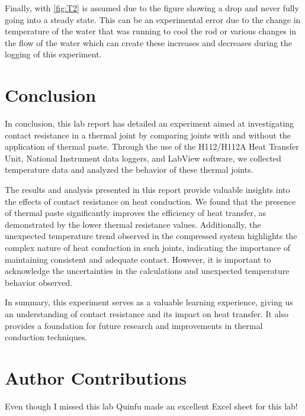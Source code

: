 \documentclass[10pt,twocolumn]{article}
\begin{document}
 Finally, with  \autoref{fig:T2} is assumed due to the figure showing a drop and never fully going into a steady state. This can be an experimental error due to the change in temperature of the water that was running to cool the rod or various changes in the flow of the water which can create these increases and decreases during the logging of this experiment. 

 

\section{Conclusion}

In conclusion, this lab report has detailed an experiment aimed at investigating contact resistance in a thermal joint by comparing joints with and without the application of thermal paste. Through the use of the H112/H112A Heat Transfer Unit, National Instrument data loggers, and LabView software, we collected temperature data and analyzed the behavior of these thermal joints.

The results and analysis presented in this report provide valuable insights into the effects of contact resistance on heat conduction. We found that the presence of thermal paste significantly improves the efficiency of heat transfer, as demonstrated by the lower thermal resistance values. Additionally, the unexpected temperature trend observed in the compressed system highlights the complex nature of heat conduction in such joints, indicating the importance of maintaining consistent and adequate contact. However, it is important to acknowledge the uncertainties in the calculations and unexpected temperature behavior observed.

In summary, this experiment serves as a valuable learning experience, giving us an understanding of contact resistance and its impact on heat transfer. It also provides a foundation for future research and improvements in thermal conduction techniques.

\section{Author Contributions}

Even though I missed this lab Quinfu made an excellent Excel sheet for this lab!




\end{document}
